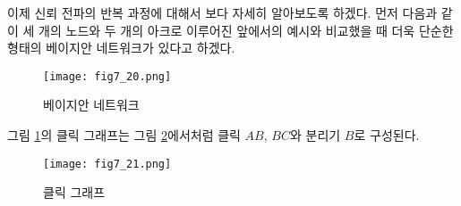 \documentclass[a4paper]{oblivoir}
\begin{document}
이제 신뢰 전파의 반복 과정에 대해서 보다 자세히 알아보도록 하겠다. 먼저 다음과 같이 세 개의 노드와 두 개의 아크로 이루어진 앞에서의 예시와 비교했을 때 더욱 단순한 형태의 베이지안 네트워크가 있다고 하겠다.  \\

\begin{figure}[ht] \centering 
\texttt{[image: fig7\_20.png]} 
\caption{베이지안 네트워크}
\label{fig:7-22}
\end{figure} 

\noindent 그림 \ref{fig:7-22}의 클릭 그래프는 그림 \ref{fig:7-26}에서처럼 클릭 $AB$, $BC$와 분리기 $B$로 구성된다. \\

\begin{figure}[ht] \centering 
\texttt{[image: fig7\_21.png]} 
\caption{클릭 그래프}
\label{fig:7-26}
\end{figure} 
\end{document}
